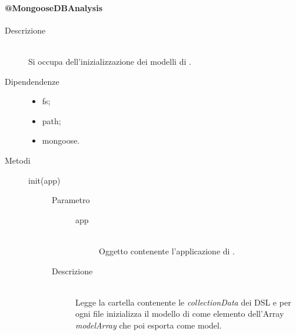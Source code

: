 \paragraph{@MongooseDBAnalysis}
\begin{description}
 \item[Descrizione] \hfill \\
 Si occupa dell'inizializzazione dei modelli di .
 \item[Dipendendenze] \hfill
    \begin{itemize}
    \item fs;
    \item path;
    \item mongoose.
    \end{itemize}
\item[Metodi] \hfill
 \begin{description}
 \item[init(app)] \hfill 
 \begin{description}
     		\item[Parametro] \hfill
     			\begin{description}
     				\item[app] \hfill \\
     				Oggetto contenente l'applicazione di .
     			\end{description}
     		\item[Descrizione] \hfill \\
     		 Legge la cartella contenente le \textit{collectionData} dei DSL e per ogni file inizializza il modello di  come elemento dell'Array \textit{modelArray} che poi esporta come model.
     	\end{description}

 \end{description}
\end{description}

